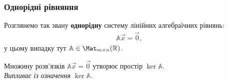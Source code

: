 \documentclass{math_library}
\begin{document}
\subsubsection{Однорідні рівняння}
Розглянемо так звану \textbf{однорідну} систему лінійних алгебраїчних рівнянь:
\begin{align*}
\mathbb{A} \vec{x} = \vec{0},
\end{align*}
у цьому випадку тут $\mathbb{A} \in \Mat_{m \times n}(\mathbb{R})$.

\begin{proposition}
Множину розв'язків $\mathbb{A} \vec{x} = \vec{0}$ утворює простір $\ker { \mathbb{A}}$.\\
\textit{Випливає із означення $\ker { \mathbb{A}}$.}
\end{proposition}
\end{document}
